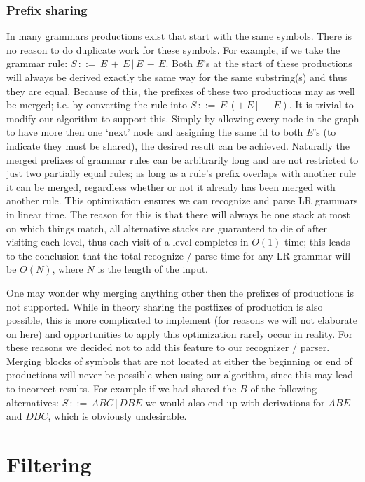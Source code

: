\documentclass[a4paper,10pt]{article}
\begin{document}
\subsubsection{Prefix sharing}
\label{sec:prefixSharing}
In many grammars productions exist that start with the same symbols. There is no reason to do duplicate work for these symbols. For example, if we take the grammar rule: $S\,::=\,E\,+\,E\,|\,E\,-\,E$. Both $E$'s at the start of these productions will always be derived exactly the same way for the same substring(s) and thus they are equal. Because of this, the prefixes of these two productions may as well be merged; i.e. by converting the rule into $S\,::=\,E\,(+\,E\,|\,-\,E)$. It is trivial to modify our algorithm to support this. Simply by allowing every node in the graph to have more then one `next' node and assigning the same id to both $E$'s (to indicate they must be shared), the desired result can be achieved. Naturally the merged prefixes of grammar rules can be arbitrarily long and are not restricted to just two partially equal rules; as long as a rule's prefix overlaps with another rule it can be merged, regardless whether or not it already has been merged with another rule. This optimization ensures we can recognize and parse LR grammars in linear time. The reason for this is that there will always be one stack at most on which things match, all alternative stacks are guaranteed to die of after visiting each level, thus each visit of a level completes in $O(1)$ time; this leads to the conclusion that the total recognize / parse time for any LR grammar will be $O(N)$, where $N$ is the length of the input.

One may wonder why merging anything other then the prefixes of productions is not supported. While in theory sharing the postfixes of production is also possible, this is more complicated to implement (for reasons we will not elaborate on here) and opportunities to apply this optimization rarely occur in reality. For these reasons we decided not to add this feature to our recognizer / parser. Merging blocks of symbols that are not located at either the beginning or end of productions will never be possible when using our algorithm, since this may lead to incorrect results. For example if we had shared the $B$ of the following alternatives: $S\,::=\,ABC\,|\,DBE$ we would also end up with derivations for $ABE$ and $DBC$, which is obviously undesirable.

\section{Filtering}
\label{chap:filtering}
\end{document}
